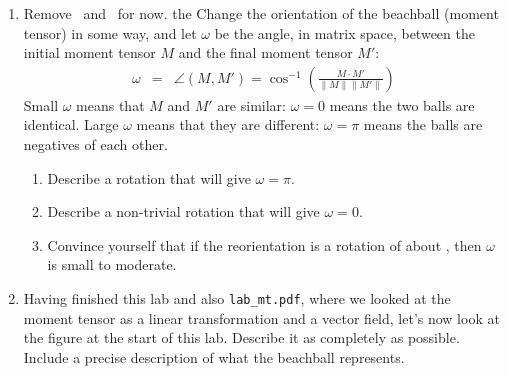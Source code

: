 \documentclass[11pt,titlepage,fleqn]{article}
\newcommand{\fvecb}{\textcolor{blue}{\mbB}}
\newcommand{\fvecp}{\textcolor{black}{\mbP}}
\newcommand{\fvecn}{\mbN}
\newcommand{\fvecs}{\mbS}
\begin{document}
\begin{enumerate}
\begin{enumerate}
\end{enumerate}


\item Remove \fvecn\ and \fvecs\ for now. the Change the orientation of the beachball (moment tensor) in some way, and let $\omega$ be the angle, in matrix space, between the initial moment tensor $M$ and the final moment tensor $M'$:
%
\begin{eqnarray}
\omega &=& \angle(M,M') = \cos^{-1}\left( \frac{M \cdot M'}{\|M\| \|M'\|} \right)
\end{eqnarray}
%
Small $\omega$ means that $M$ and $M'$ are similar: $\omega=0$ means the two balls are identical.
Large $\omega$ means that they are different: $\omega=\pi$ means the balls are negatives of each other.

\begin{enumerate}
\item Describe a rotation that will give $\omega=\pi$.

\item Describe a non-trivial rotation that will give $\omega=0$.

\item Convince yourself that if the reorientation is a rotation of  about \fvecp, then $\omega$ is small to moderate.

\end{enumerate}






\item Having finished this lab and also \verb+lab_mt.pdf+, where we looked at the moment tensor as a linear transformation and a vector field, let's now look at the figure at the start of this lab. Describe it as completely as possible. Include a precise description of what the beachball represents.

\end{enumerate}



\end{document}
